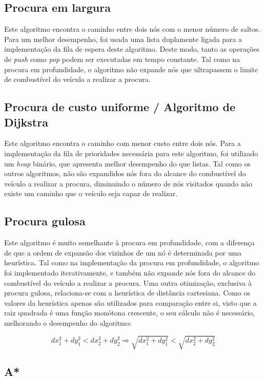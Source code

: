\documentclass[12pt, a4paper]{article}
\begin{document}
\subsection{Procura em largura}

Este algoritmo encontra o caminho entre dois nós com o menor número de saltos. Para um melhor
desempenho, foi usada uma lista duplamente ligada para a implementação da fila de espera deste
algoritmo. Deste modo, tanto as operações de \emph{push} como \emph{pop} podem ser executadas em
tempo constante. Tal como na procura em profundidade, o algoritmo não expande nós que ultrapassem o
limite de combustível do veículo a realizar a procura.

\subsection{Procura de custo uniforme / Algoritmo de Dijkstra}

Este algoritmo encontra o caminho com menor custo entre dois nós. Para a implementação da fila de
prioridades necessária para este algoritmo, foi utilizado um \emph{heap} binário, que apresenta
melhor desempenho do que listas. Tal como os outros algoritmos, não são expandidos nós fora do
alcance do combustível do veículo a realizar a procura, diminuindo o número de nós visitados quando
não existe um caminho que o veículo seja capaz de realizar.

\subsection{Procura gulosa}

Este algoritmo é muito semelhante à procura em profundidade, com a diferença de que a ordem de
expansão dos vizinhos de um nó é determinada por uma heurística. Tal como na implementação da
procura em profundidade, o algoritmo foi implementado iterativamente, e também não expande nós
fora do alcance do combustível do veículo a realizar a procura. Uma outra otimização, exclusiva à
procura gulosa, relaciona-se com a heurística de distância cartesiana. Como os valores da
heurística apenas são utilizados para comparação entre si, visto que a raiz quadrada é uma função
monótona crescente, o seu cálculo não é necessário, melhorando o desempenho do algoritmo:

$$
    dx_1^2 + dy_1^2 < dx_2^2 + dy_2^2
    \Rightarrow
    \sqrt{dx_1^2 + dy_1^2} < \sqrt{dx_2^2 + dy_2^2}
$$

\subsection{A*}
\end{document}
